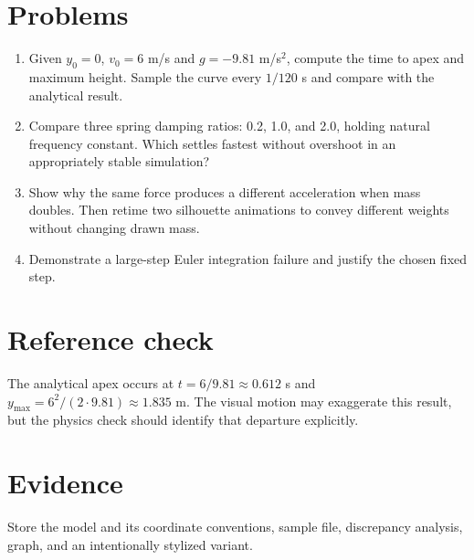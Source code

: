 \documentclass[10pt,letterpaper]{article}
\begin{document}
\makedoctitle
\makedocsummary

\section{Problems}
\begin{enumerate}
\item Given $y_0=0$, $v_0=6$ m/s and $g=-9.81$ m/s$^2$, compute the time to apex and maximum height. Sample the curve every $1/120$ s and compare with the analytical result.
\item Compare three spring damping ratios: 0.2, 1.0, and 2.0, holding natural frequency constant. Which settles fastest without overshoot in an appropriately stable simulation?
\item Show why the same force produces a different acceleration when mass doubles. Then retime two silhouette animations to convey different weights without changing drawn mass.
\item Demonstrate a large-step Euler integration failure and justify the chosen fixed step.
\end{enumerate}
\section{Reference check}
The analytical apex occurs at $t=6/9.81\approx0.612$ s and $y_{\max}=6^2/(2\cdot9.81)\approx1.835$ m. The visual motion may exaggerate this result, but the physics check should identify that departure explicitly.
\section{Evidence}
Store the model and its coordinate conventions, sample file, discrepancy analysis, graph, and an intentionally stylized variant.
\end{document}

